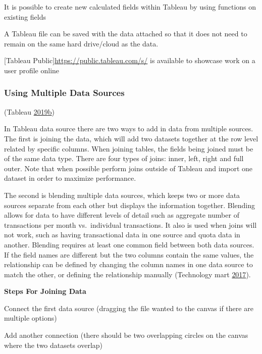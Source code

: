 \documentclass[]{book}
\begin{document}
It is possible to create new calculated fields within Tableau by using functions on existing fields

A Tableau file can be saved with the data attached so that it does not need to remain on the same hard drive/cloud as the data.

{[}Tableau Public{]}\url{https://public.tableau.com/s/} is available to showcase work on a user profile online

\hypertarget{using-multiple-data-sources}{%
\subsubsection{Using Multiple Data Sources}\label{using-multiple-data-sources}}

(Tableau \protect\hyperlink{ref-TableauHelp_connections}{2019}\protect\hyperlink{ref-TableauHelp_connections}{b})

In Tableau data source there are two ways to add in data from multiple sources. The first is joining the data, which will add two datasets together at the row level related by specific columns. When joining tables, the fields being joined must be of the same data type. There are four types of joins: inner, left, right and full outer. Note that when possible perform joins outside of Tableau and import one dataset in order to maximize performance.

The second is blending multiple data sources, which keeps two or more data sources separate from each other but displays the information together. Blending allows for data to have different levels of detail such as aggregate number of transactions per month vs.~individual transactions. It also is used when joins will not work, such as having transactional data in one source and quota data in another. Blending requires at least one common field between both data sources. If the field names are different but the two columns contain the same values, the relationship can be defined by changing the column names in one data source to match the other, or defining the relationship manually (Technology mart \protect\hyperlink{ref-datablendingintableau}{2017}).

\textbf{Steps For Joining Data}

Connect the first data source (dragging the file wanted to the canvas if there are multiple options)

Add another connection (there should be two overlapping circles on the canvas where the two datasets overlap)
\end{document}
